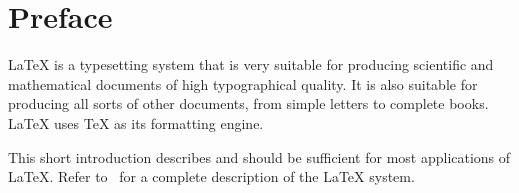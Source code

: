 

\chapter*{Preface}

\LaTeX{} \cite{manual} is a typesetting system that is very 
suitable for producing scientific and mathematical documents of high
typographical quality. It is also suitable for producing all
sorts of other documents, from simple letters to complete books.
\LaTeX{} uses \TeX{} \cite{texbook} as its formatting engine.

This short introduction describes \LaTeXe{} and should be sufficient
for most applications of \LaTeX. Refer to~\cite{manual,companion} for
a complete description of the \LaTeX{} system.

